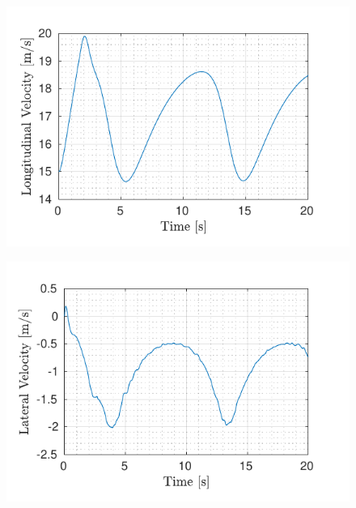 \begin{figure}[!h]
	\begin{minipage}[t]{0.5\textwidth}
		\includegraphics[width=\textwidth]{../../MATLAB/lane_following_circular_path/figure/LongitudinalVelocityVsTime_circular.pdf}
		\label{fig:longitudinal_velocity_laneFollowing_circular}
	\end{minipage}
	\begin{minipage}[t]{0.5\textwidth}
		\includegraphics[width=\textwidth]{../../MATLAB/lane_following_circular_path/figure/LateralVelocityVsTime_circular.pdf}
		\label{fig:lateral_velocity_laneFollowing_circular}
	\end{minipage}
	\begin{minipage}[t]{0.5\textwidth}

\end{minipage}
\end{figure}
